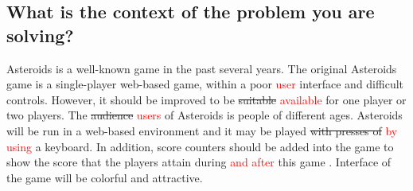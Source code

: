 \documentclass{article}
\begin{document}
\subsection{What is the context of the problem you are solving?}
Asteroids is a well-known game in the past several years. The original Asteroids game is a single-player web-based game, within a poor \textcolor{red}{user} interface and difficult controls. However, it should be improved to be \sout{suitable} \textcolor{red}{available} for one player or two players. The \sout{audience} \textcolor{red}{users} of Asteroids is people of different ages. Asteroids will be run in a web-based environment and it may be played \sout{with presses of} \textcolor{red}{by using} a keyboard. In addition, score counters should be added into the game to show the score that the players attain during \textcolor{red}{and after} this game . Interface of the game will be colorful and attractive. 
\end{document}
